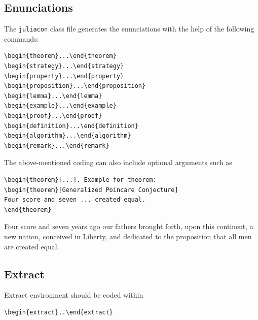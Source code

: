 \documentclass{juliacon}
\begin{document}
\subsection{Enunciations}
\label{subsub:enunciation}
The \verb|juliacon|   class file generates the enunciations with the help of
the following commands:
\begin{verbatim}
\begin{theorem}...\end{theorem}
\begin{strategy}...\end{strategy}
\begin{property}...\end{property}
\begin{proposition}...\end{proposition}
\begin{lemma}...\end{lemma}
\begin{example}...\end{example}
\begin{proof}...\end{proof}
\begin{definition}...\end{definition}
\begin{algorithm}...\end{algorithm}
\begin{remark}...\end{remark}
\end{verbatim}
The above-mentioned coding can also include optional arguments
such as
\begin{verbatim}
\begin{theorem}[...]. Example for theorem:
\begin{theorem}[Generalized Poincare Conjecture]
Four score and seven ... created equal.
\end{theorem}
\end{verbatim}

\begin{theorem}
Four score and seven years ago our fathers brought forth,
upon this continent, a new nation, conceived in Liberty,
 and dedicated to the proposition that all men are
created equal.
\end{theorem}


\subsection{Extract}
\label{subsub:extract}
Extract environment should be coded within
\begin{verbatim}
\begin{extract}..\end{extract}
\end{verbatim}
\end{document}
